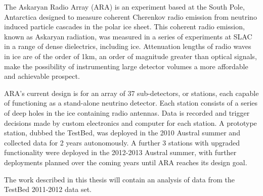 The Askaryan Radio Array (ARA) is an experiment based at the South Pole, Antarctica designed to measure coherent Cherenkov radio emission from neutrino induced particle cascades in the polar ice sheet. This coherent radio emission, known as Askaryan radiation, was measured in a series of experiments at SLAC in a range of dense dielectrics, including ice. Attenuation lengths of radio waves in ice are of the order of 1km, an order of magnitude greater than optical signals, make the possibility of instrumenting large detector volumes a more affordable and achievable prospect.

ARA's current design is for an array of 37 sub-detectors, or stations, each capable of functioning as a stand-alone neutrino detector. Each station consists of a series of deep holes in the ice containing radio antennas. Data is recorded and trigger decisions made by custom electronics and computer for each station. A prototype station, dubbed the TestBed, was deployed in the 2010 Austral summer and collected data for 2 years autonomously. A further 3 stations with upgraded functionality were deployed in the 2012-2013 Austral summer, with further deployments planned over the coming years until ARA reaches its design goal.

The work described in this thesis will contain an analysis of data from the TestBed 2011-2012 data set. 




